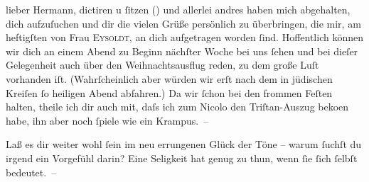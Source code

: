 \pstart{}lieber Hermann,\pend\vspace{0.5em}
\pstart
           dictiren u{ }ſitzen (\label{K_L01475-1v}\label{K_L01475-1}) und allerlei andres haben mich abgehalten, dich aufzuſuchen und dir die
               vielen Grüße persönlich zu überbringen, die mir, am heftigſten von Frau \textsc{Eysoldt}, an dich aufgetragen worden{ }ſind. Hoffentlich können wir dich an einem Abend zu
               Beginn nächſter Woche bei uns{ }ſehen {\pb}und bei dieſer
               Gelegenheit auch über den Weihnachtsausflug reden, zu dem große Luſt vorhanden iſt.
               (Wahrſcheinlich aber würden wir erſt nach dem in jüdischen Kreiſen{ }ſo heiligen Abend
               abfahren.) Da wir{ }ſchon bei den frommen Feſten halten, theile ich dir auch mit, daſs
               ich zum Nicolo den Triſtan-Auszug beko{\geminationm}en habe, ihn aber {\pb}noch{ }ſpiele wie ein
               Krampus. –\pend
           
\pstart
           Laß es dir weiter wohl{ }ſein im neu errungenen Glück der Töne – warum{ }ſuchſt du irgend
               ein Vorgefühl darin? Eine Seligkeit hat genug 
               zu thun, wenn{ }ſie{ }ſich{ }ſelbſt bedeutet. –\pend
           
